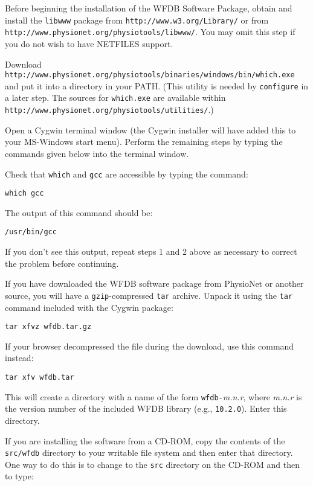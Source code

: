\documentclass[twoside]{article}
\begin{document}
Before beginning the installation of the WFDB Software Package, obtain and
install the {\tt libwww} package from {\tt http://www.w3.org/Library/} or
from {\tt http://\-www.physio\-net.org/physio\-tools/libwww/}.  You may
omit this step if you do not wish to have NETFILES support.

Download
{\tt http://www.physio\-net.org/physio\-tools/binaries/win\-dows/bin/which.exe}
and put it into a directory in your PATH.  (This utility is needed by
{\tt configure} in a later step.  The sources for {\tt which.exe} are available
within {\tt http://www.physio\-net.org/physio\-tools/util\-ities/}.)

Open a Cygwin terminal window (the Cygwin installer will have added this to
your MS-Windows start menu).  Perform the remaining steps by typing the
commands given below into the terminal window.

Check that {\tt which} and {\tt gcc} are accessible by typing the command:

\begin{verbatim}
which gcc
\end{verbatim}

The output of this command should be:

\begin{verbatim}
/usr/bin/gcc
\end{verbatim}

If you don't see this output, repeat steps 1 and 2 above as necessary to
correct the problem before continuing.

If you have downloaded the WFDB software package from PhysioNet or another
source, you will have a {\tt gzip}-compressed {\tt tar} archive.  Unpack it
using the {\tt tar} command included with the Cygwin package:

\begin{verbatim}
tar xfvz wfdb.tar.gz
\end{verbatim}

If your browser decompressed the file during the download, use this command
instead:

\begin{verbatim}
tar xfv wfdb.tar
\end{verbatim}

This will create a directory with a name of the form {\tt wfdb-}{\em m.n.r},
where {\em m.n.r} is the version number of the included WFDB library (e.g.,
{\tt 10.2.0}).  Enter this directory.

If you are installing the software from a CD-ROM, copy the contents of the
{\tt src/wfdb} directory to your writable file system and then enter that
directory.  One way to do this is to change to the {\tt src} directory on the
CD-ROM and then to type:
\end{document}
